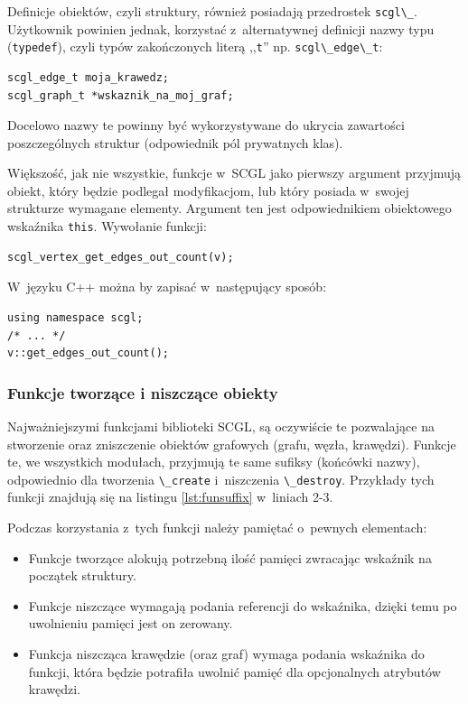 \documentclass[a4paper,12pt,polish,oneside,openright]{thesis}
\newcommand\code[1]{\lstinline[style=line]{#1}}
\begin{document}
Definicje obiektów, czyli struktury, również posiadają przedrostek \code{scgl\_}.
Użytkownik powinien jednak, korzystać z~alternatywnej definicji nazwy typu (\code{typedef}), czyli typów zakończonych literą ,,\code{t}'' np. \code{scgl\_edge\_t}:
\begin{lstlisting}[style=coden]
scgl_edge_t moja_krawedz;
scgl_graph_t *wskaznik_na_moj_graf;
\end{lstlisting}
Docelowo nazwy te powinny być wykorzystywane do ukrycia zawartości poszczególnych struktur (odpowiednik pól prywatnych klas).

Większość, jak nie wszystkie, funkcje w~SCGL jako pierwszy argument przyjmują obiekt, który będzie podlegał modyfikacjom, lub który posiada w~swojej strukturze wymagane elementy.
Argument ten jest odpowiednikiem obiektowego wskaźnika \code{this}.
Wywołanie funkcji:
\begin{lstlisting}[style=coden]
scgl_vertex_get_edges_out_count(v);
\end{lstlisting}
W~języku C++ można by zapisać w~następujący sposób:
\begin{lstlisting}[style=coden]
using namespace scgl;
/* ... */
v::get_edges_out_count();
\end{lstlisting}

\subsubsection*{Funkcje tworzące i niszczące obiekty}
Najważniejszymi funkcjami biblioteki SCGL, są oczywiście te pozwalające na stworzenie oraz zniszczenie obiektów grafowych (grafu, węzła, krawędzi).
Funkcje te, we wszystkich modułach, przyjmują te same sufiksy (końcówki nazwy), odpowiednio dla tworzenia \code{\_create} i~niszczenia \code{\_destroy}.
Przykłady tych funkcji znajdują się na listingu \ref{lst:funsuffix} w~liniach 2-3.

Podczas korzystania z~tych funkcji należy pamiętać o~pewnych elementach:
\begin{itemize}
	\item Funkcje tworzące alokują potrzebną ilość pamięci zwracając wskaźnik na początek struktury.
	\item Funkcje niszczące wymagają podania referencji do wskaźnika, dzięki temu po uwolnieniu pamięci jest on zerowany.
	\item Funkcja niszcząca krawędzie (oraz graf) wymaga podania wskaźnika do funkcji, która będzie potrafiła uwolnić pamięć dla opcjonalnych atrybutów krawędzi.
\end{itemize}
\end{document}
